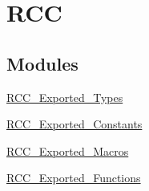 \hypertarget{group__RCC}{
\section{RCC}
\label{group__RCC}
}
\subsection*{Modules}
\begin{DoxyCompactItemize}
\item 
\hyperlink{group__RCC__Exported__Types}{RCC\_\-Exported\_\-Types}
\item 
\hyperlink{group__RCC__Exported__Constants}{RCC\_\-Exported\_\-Constants}
\item 
\hyperlink{group__RCC__Exported__Macros}{RCC\_\-Exported\_\-Macros}
\item 
\hyperlink{group__RCC__Exported__Functions}{RCC\_\-Exported\_\-Functions}
\end{DoxyCompactItemize}
